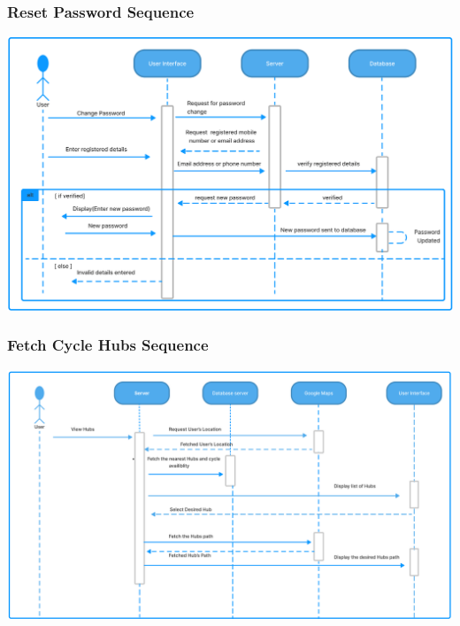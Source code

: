 \documentclass[11pt]{article}
\begin{document}
\subsubsection{Reset Password Sequence}
\begin{center}
  \includegraphics[scale=0.35]{sequence-diagram-images/reset_password.png}
\end{center}

\subsubsection{Fetch Cycle Hubs Sequence}
\begin{center}
  \includegraphics[scale=0.28]{sequence-diagram-images/fetch_hubs.png}
\end{center}
\end{document}
